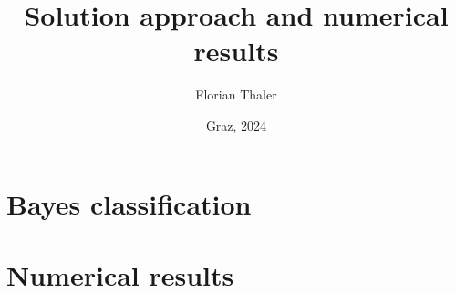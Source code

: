\documentclass{article}
\title{Solution approach and numerical results}
\author{Florian Thaler}
\date{Graz, 2024}
\begin{document}
    \maketitle

    \tableofcontents
    \newpage
    \section{Bayes classification}
        
        \newpage

    \section{Numerical results}
%        
        \newpage

    
    
\end{document}
